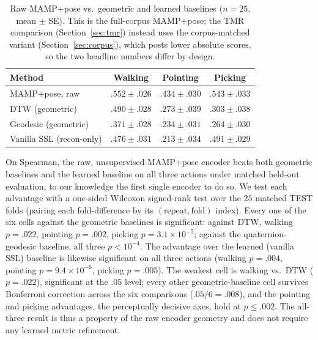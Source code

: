 \documentclass[letterpaper]{article} %
\begin{document}
\begin{table}[h]
\centering
\setlength{\tabcolsep}{1pt}
\small
\caption{Raw MAMP+pose vs.\ geometric and learned baselines ($n=25$, mean $\pm$ SE). This is the
full-corpus MAMP+pose; the TMR comparison (Section~\ref{sec:tmr}) instead uses the corpus-matched variant
(Section~\ref{sec:corpus}), which posts lower absolute scores, so the two headline numbers differ by design.}
\begin{tabular}{lccc}
\toprule
Method & Walking & Pointing & Picking \\
\midrule
{MAMP+pose, raw} & $\mathbf{.552{\scriptstyle\pm}.026}$ & $\mathbf{.434{\scriptstyle\pm}.030}$ & $\mathbf{.543{\scriptstyle\pm}.033}$ \\
DTW (geometric)        & $.490{\scriptstyle\pm}.028$ & $.273{\scriptstyle\pm}.039$ & $.303{\scriptstyle\pm}.038$ \\
Geodesic (geometric)   & $.371{\scriptstyle\pm}.028$ & $.234{\scriptstyle\pm}.031$ & $.264{\scriptstyle\pm}.030$ \\
Vanilla SSL (recon-only) & $.476{\scriptstyle\pm}.031$ & $.213{\scriptstyle\pm}.034$ & $.491{\scriptstyle\pm}.029$ \\
\bottomrule
\end{tabular}
\end{table}

On Spearman, the {raw, unsupervised MAMP+pose encoder beats both geometric baselines and
the learned baseline on all three actions} under matched held-out evaluation, to our knowledge
the first single encoder to do so. We test each advantage with a one-sided Wilcoxon signed-rank
test over the $25$ matched TEST folds (pairing each fold-difference by its $(\text{repeat},
\text{fold})$ index). Every one of the six cells against the geometric baselines is significant:
against DTW, walking $p{=}.022$, pointing $p{=}.002$, picking $p{=}3.1{\times}10^{-5}$; against the
quaternion-geodesic baseline, all three $p{<}10^{-4}$. The advantage over the learned (vanilla SSL)
baseline is likewise significant on all three actions (walking $p{=}.004$, pointing
$p{=}9.4{\times}10^{-6}$, picking $p{=}.005$). The weakest cell is walking vs.\ DTW ($p{=}.022$),
significant at the $.05$ level; every other geometric-baseline cell survives Bonferroni correction
across the six comparisons ($.05/6{=}.008$), and the pointing and picking advantages, the
perceptually decisive axes, hold at $p{\le}.002$. The all-three result is thus a property of the
raw encoder geometry and does not require any learned metric refinement.
\end{document}
